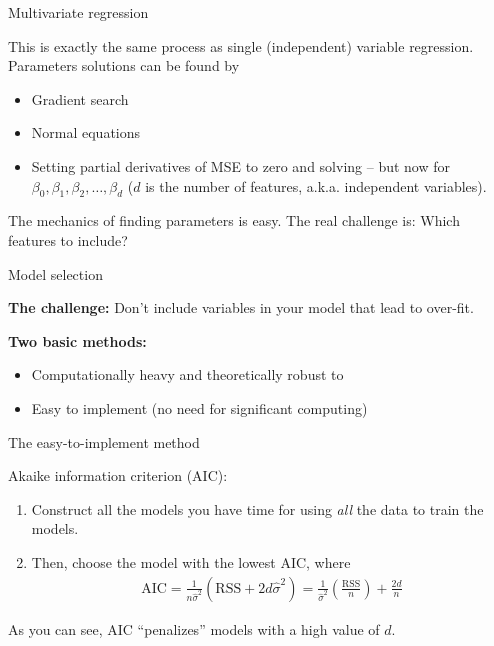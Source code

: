 \documentclass[aspectratio=169]{beamer}
\begin{document}
\begin{frame}{Multivariate regression}

This is exactly the same process as single (independent) variable regression.  Parameters solutions can be found by
\begin{itemize}
\item Gradient search
\item Normal equations
\item Setting partial derivatives of MSE to zero and solving -- but now for $\beta_0, \beta_1, \beta_2,\ldots,\beta_d$ ($d$ is the number of features, a.k.a. independent variables).
\end{itemize}

\vspace{5mm}
The mechanics of finding parameters is easy.  The real challenge is: Which features to include?
\end{frame}

\begin{frame}{Model selection}

\textbf{The challenge:} Don't include variables in your model that lead to over-fit.

\textbf{Two basic methods:}
\begin{itemize}
\item Computationally heavy and theoretically robust to 
\item Easy to implement (no need for significant computing)
\end{itemize}
\end{frame}

\begin{frame}{The easy-to-implement method}

Akaike information criterion (AIC):

\begin{enumerate}
\item Construct all the models you have time for using \textit{all} the data to train the models.
\item Then, choose the model with the lowest AIC, where
\begin{align*}
\text{AIC} = \frac{1}{n\hat{\sigma}^2}(\text{RSS}+2d\hat{\sigma}^2) = \frac{1}{\hat{\sigma}^2}\left(\frac{\text{RSS}}{n}\right) + \frac{2d}{n}
\end{align*}
\end{enumerate}

As you can see, AIC ``penalizes'' models with a high value of $d$.  
\end{frame}
\end{document}
